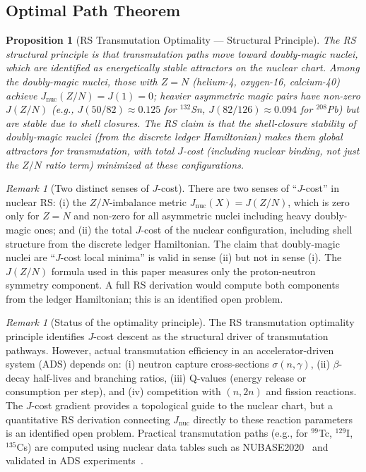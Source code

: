 \documentclass[12pt,a4paper]{article}
\newtheorem{proposition}[theorem]{Proposition}
\theoremstyle{definition}
\theoremstyle{remark}
\newtheorem{remark}[theorem]{Remark}
\begin{document}
\subsection{Optimal Path Theorem}

\begin{proposition}[RS Transmutation Optimality --- Structural Principle]
\label{prop:opt}
The RS structural principle is that transmutation paths move toward doubly-magic
nuclei, which are identified as energetically stable attractors on the nuclear
chart.  Among the doubly-magic nuclei, those with $Z = N$ (helium-4, oxygen-16,
calcium-40) achieve $J_\mathrm{nuc}(Z/N) = J(1) = 0$; heavier asymmetric magic
pairs have non-zero $J(Z/N)$ (e.g., $J(50/82) \approx 0.125$ for $^{132}$Sn,
$J(82/126) \approx 0.094$ for $^{208}$Pb) but are stable due to shell closures.
The RS claim is that the shell-closure stability of doubly-magic nuclei (from the
discrete ledger Hamiltonian) makes them global attractors for transmutation, with
total $J$-cost (including nuclear binding, not just the $Z/N$ ratio term) minimized
at these configurations.
\end{proposition}

\begin{remark}[Two distinct senses of $J$-cost]
\label{rem:two-senses}
There are two senses of ``$J$-cost'' in nuclear RS:
(i) the $Z/N$-imbalance metric $J_\mathrm{nuc}(X) = J(Z/N)$, which is zero
only for $Z = N$ and non-zero for all asymmetric nuclei including heavy
doubly-magic ones; and (ii) the total $J$-cost of the nuclear configuration,
including shell structure from the discrete ledger Hamiltonian.  The claim that
doubly-magic nuclei are ``$J$-cost local minima'' is valid in sense (ii) but not
in sense (i).  The $J(Z/N)$ formula used in this paper measures only the
proton-neutron symmetry component.  A full RS derivation would compute both
components from the ledger Hamiltonian; this is an identified open problem.
\end{remark}

\begin{remark}[Status of the optimality principle]
The RS transmutation optimality principle identifies $J$-cost descent as the
structural driver of transmutation pathways.  However, actual transmutation
efficiency in an accelerator-driven system (ADS) depends on: (i) neutron
capture cross-sections $\sigma(n,\gamma)$, (ii) $\beta$-decay half-lives and
branching ratios, (iii) Q-values (energy release or consumption per step),
and (iv) competition with $(n, 2n)$ and fission reactions.  The $J$-cost
gradient provides a topological guide to the nuclear chart, but a quantitative
RS derivation connecting $J_\mathrm{nuc}$ directly to these reaction parameters
is an identified open problem.  Practical transmutation paths (e.g., for
$^{99}$Tc, $^{129}$I, $^{135}$Cs) are computed using nuclear data tables such
as NUBASE2020~\cite{Kondev2021} and validated in ADS experiments~\cite{Salvatores2002}.
\end{remark}
\end{document}
